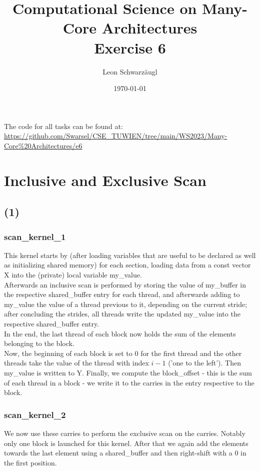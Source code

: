 \documentclass[11pt]{article}
\author{Leon Schwarzäugl}
\date{\today}
\title{Computational Science on Many-Core Architectures \\Exercise 6}
\begin{document}
\maketitle
The code for all tasks can be found at: \url{https://github.com/Swarsel/CSE_TUWIEN/tree/main/WS2023/Many-Core%20Architectures/e6}
\newpage
\section{Inclusive and Exclusive Scan}

\subsection{(1)}


\subsubsection{scan_kernel_1}
This kernel starts by (after loading variables that are useful to be declared as well as initializing shared memory) for each section, loading data from a const vector X into the (private) local variable my_value. \\
Afterwards an inclusive scan is performed by storing the value of my_buffer in the respective shared_buffer entry for each thread, and afterwards adding to my_value the value of a thread previous to it, depending on the current stride; after concluding the strides, all threads write the updated my_value into the respective shared_buffer entry. \\
In the end, the last thread of each block now holds the sum of the elements belonging to the block.
\\
Now, the beginning of each block is set to \(0\) for the first thread and the other threads take the value of the thread with index \(i - 1\) ('one to the left'). Then my_value is written to Y. Finally, we compute the block_offset - this is the sum of each thread in a block - we write it to the carries in the entry respective to the block.

\subsubsection{scan_kernel_2}

We now use these carries to perform the exclusive scan on the carries.
Notably only one block is launched for this kernel.
After that we again add the elements towards the last element using a shared_buffer and then  right-shift with a \(0\) in the first position.
\end{document}
